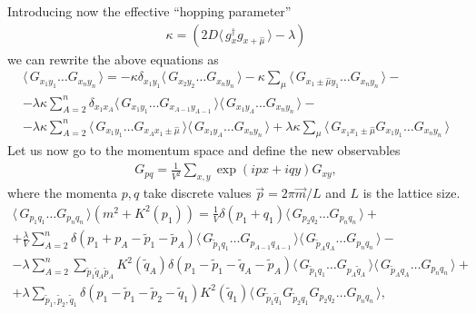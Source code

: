 \documentclass[twocolumn,showpacs,preprintnumbers,superscriptaddress,amsmath,floatfix,amssymb,secnumarabic]{revtex4}
\newcommand{\lr}[1]{ \left( #1 \right) }
\newcommand{\vev}[1]{ \langle \, #1 \, \rangle }
\newcommand{\expa}[1]{ \exp{\left( #1 \right)} }
\begin{document}
\begin{widetext}
Introducing now the effective ``hopping parameter''
\begin{eqnarray}
\label{eff_hopping}
 \kappa = \lr{2 D \vev{g^{\dag}_x g_{x+\hat{\mu}}} - \lambda}
\end{eqnarray}
we can rewrite the above equations as
\begin{eqnarray}
\label{sd_G_general_kappa}
 \vev{ G_{x_1 y_1} \ldots G_{x_n y_n} }
 =
 -\kappa \delta_{x_1 y_1} \vev{G_{x_2 y_2} \ldots G_{x_n y_n}}
 -\kappa \sum\limits_{\mu} \vev{ G_{x_1 \pm \hat{\mu} y_1} \ldots G_{x_n y_n} }
 - \nonumber \\ -
 \lambda \kappa \sum\limits_{A=2}^{n} \delta_{x_1 x_A} \vev{G_{x_1 y_1} \ldots G_{x_{A-1} y_{A-1}}} \vev{G_{x_1 y_A} \ldots G_{x_n y_n}}
 - \nonumber \\ -
 \lambda \kappa \sum\limits_{A=2}^{n} \vev{G_{x_1 y_1} \ldots G_{x_{A} x_{1} \pm \hat{\mu}}} \vev{G_{x_1 y_A} \ldots G_{x_n y_n}}
 +
 \lambda \kappa \sum\limits_{\mu} \vev{G_{x_1 x_1 \pm \hat{\mu}} G_{x_1 y_1} \ldots G_{x_n y_n}}
\end{eqnarray}
Let us now go to the momentum space and define the new observables
\begin{eqnarray}
\label{momentum_space_observables}
 G_{p q} = \frac{1}{V^2} \sum\limits_{x, y} \expa{i p x + i q y} G_{x y},
\end{eqnarray}
where the momenta $p, q$ take discrete values $\vec{p} = 2 \pi \vec{m}/L$ and $L$ is the lattice size.
\begin{eqnarray}
\label{sd_G_general_kappa_momentum_preliminary}
 \vev{ G_{p_1 q_1} \ldots G_{p_n q_n} } \lr{m^2 + K^2\lr{p_1}}
 =
  \frac{1}{V} \delta\lr{p_1 + q_1} \vev{G_{p_2 q_2} \ldots G_{p_n q_n}}
 + \nonumber \\ +
 \frac{\lambda}{V} \sum\limits_{A=2}^{n} \delta\lr{p_1 + p_A - \tilde{p}_1 - \tilde{p}_A} \vev{G_{\tilde{p}_1 q_1} \ldots G_{p_{A-1} q_{A-1}}} \vev{G_{\tilde{p}_A q_A} \ldots G_{p_n q_n}}
 - \nonumber \\ -
 \lambda \sum\limits_{A=2}^{n}
 \sum\limits_{\tilde{p}_1 \tilde{q}_A \tilde{p}_A} K^2\lr{\tilde{q}_A}
 \delta\lr{p_1 - \tilde{p}_1 - \tilde{q}_A - \tilde{p}_A}
 \vev{G_{\tilde{p}_1 q_1} \ldots G_{p_{A} \tilde{q}_A}} \vev{G_{\tilde{p}_A q_A} \ldots G_{p_n q_n}}
 + \nonumber \\ +
 \lambda \sum\limits_{\tilde{p}_1, \tilde{p}_2, \tilde{q}_1}
 \delta\lr{p_1 - \tilde{p}_1 - \tilde{p}_2 - \tilde{q}_1} K^2\lr{\tilde{q}_1} \vev{G_{\tilde{p}_1 \tilde{q}_1} G_{\tilde{p}_2 q_1} G_{p_2 q_2} \ldots G_{p_n q_n}} ,
\end{eqnarray}

\end{widetext}
\end{document}
